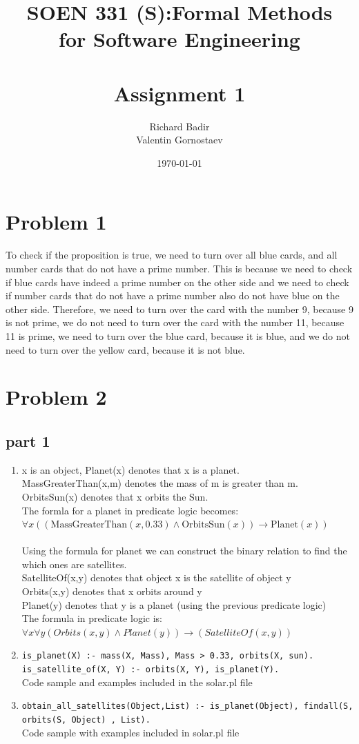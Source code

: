 \documentclass[12pt]{article}
\title{SOEN 331 (S):Formal Methods\\for Software Engineering\\
\ \\
Assignment 1}
\author{Richard Badir\\Valentin Gornostaev}
\date{\today}
\begin{document}
\maketitle
\newpage
\section*{Problem 1}
To check if the proposition is true, we need to turn over all blue cards, and all number cards that do not have a prime number.
 This is because we need to check if blue cards have indeed a prime number on the other side and we need to check if number cards 
 that do not have a prime number also do not have blue on the other side. Therefore, we need to turn over the card with the number 9,
  because 9 is not prime, we do not need to turn over the card with the number 11, because 11 is prime, we need to turn over the blue
   card, because it is blue, and we do not need to turn over the yellow card, because it is not blue.
\section*{Problem 2}
\subsection*{part 1}
\begin{enumerate}
	\item  x is an object, Planet(x) denotes that x is a planet.\\ MassGreaterThan(x,m) denotes the mass of m is greater than m.\\ OrbitsSun(x) denotes
	that x orbits the Sun.\\ The formla for a planet in predicate logic becomes:\\
	$\forall x ((\text{MassGreaterThan}(x, 0.33) \land \text{OrbitsSun}(x)) \rightarrow \text{Planet}(x))$
	\\
	\\Using the formula for planet we can construct the binary relation to find the which ones are satellites.
	\\ SatelliteOf(x,y) denotes that object x is the satellite of object y
	\\ Orbits(x,y) denotes that x orbits around y
	\\ Planet(y) denotes that y is a planet (using the previous predicate logic)
	\\The formula in predicate logic is:
	\\ $\forall x \forall y (Orbits(x, y) \land Planet(y)) \rightarrow (SatelliteOf(x, y))$
	\item \texttt{is\_planet(X) :- mass(X, Mass), Mass > 0.33, orbits(X, sun).}
	\\
	\texttt{is\_satellite\_of(X, Y) :- orbits(X, Y), is\_planet(Y).}
	\\Code sample and examples included in the solar.pl file
	\item \texttt{obtain\_all\_satellites(Object,List) :- is\_planet(Object),
	findall(S, orbits(S, Object) , List).}
	\\Code sample with examples included in solar.pl file
    \end{enumerate}
\end{document}
